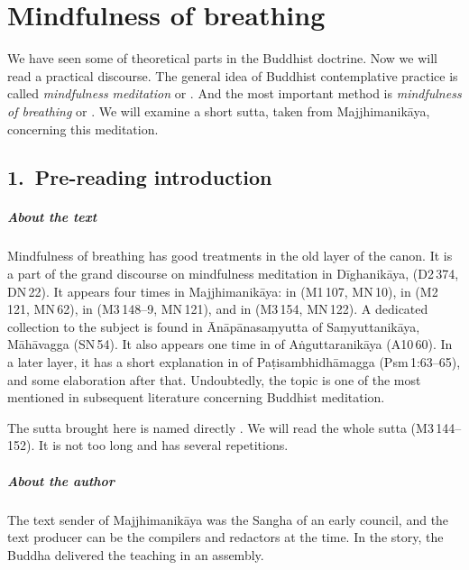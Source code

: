 \chapter{Mindfulness of breathing}\label{chap:mindfulness}

We have seen some of theoretical parts in the Buddhist doctrine. Now we will read a practical discourse. The general idea of Buddhist contemplative practice is called \emph{mindfulness meditation} or . And the most important method is \emph{mindfulness of breathing} or . We will examine a short sutta, taken from Majjhimanik\=aya, concerning this meditation.

{}
\section*{1.\ Pre-reading introduction}

\paragraph*{About the text} Mindfulness of breathing has good treatments in the old layer of the canon. It is a part of the grand discourse on mindfulness meditation in D\=ighanik\=aya,  (D2\,374, DN\,22). It appears four times in Majjhimanik\=aya: in  (M1\,107, MN\,10), in  (M2\,121, MN\,62), in  (M3\,148--9, MN\,121), and in  (M3\,154, MN\,122). A dedicated collection to the subject is found in \=An\=ap\=anasa\d myutta of Sa\d myuttanik\=aya, M\=ah\=avagga (SN\,54). It also appears one time in  of A\.nguttaranik\=aya (A10\,60). In a later layer, it has a short explanation in  of Pa\d tisambhidh\=amagga (Psm\,1:63--65), and some elaboration after that. Undoubtedly, the topic is one of the most mentioned in subsequent literature concerning Buddhist meditation.

The sutta brought here is named directly . We will read the whole sutta (M3\,144--152). It is not too long and has several repetitions.

\paragraph*{About the author} The text sender of Majjhimanik\=aya was the Sangha of an early council, and the text producer can be the compilers and redactors at the time. In the story, the Buddha delivered the teaching in an assembly.

